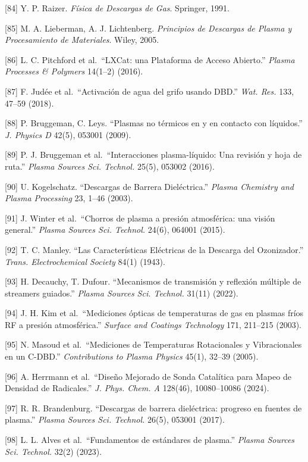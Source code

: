 \documentclass[
]{article}
\begin{document}
{[}84{]} Y. P. Raizer. \emph{Física de Descargas de Gas}. Springer,
1991.

{[}85{]} M. A. Lieberman, A. J. Lichtenberg. \emph{Principios de
Descargas de Plasma y Procesamiento de Materiales}. Wiley, 2005.

{[}86{]} L. C. Pitchford et al.~``LXCat: una Plataforma de Acceso
Abierto.'' \emph{Plasma Processes \& Polymers} 14(1--2) (2016).

{[}87{]} F. Judée et al.~``Activación de agua del grifo usando DBD.''
\emph{Wat. Res.} 133, 47--59 (2018).

{[}88{]} P. Bruggeman, C. Leys. ``Plasmas no térmicos en y en contacto
con líquidos.'' \emph{J. Physics D} 42(5), 053001 (2009).

{[}89{]} P. J. Bruggeman et al.~``Interacciones plasma-líquido: Una
revisión y hoja de ruta.'' \emph{Plasma Sources Sci. Technol.} 25(5),
053002 (2016).

{[}90{]} U. Kogelschatz. ``Descargas de Barrera Dieléctrica.''
\emph{Plasma Chemistry and Plasma Processing} 23, 1--46 (2003).

{[}91{]} J. Winter et al.~``Chorros de plasma a presión atmosférica: una
visión general.'' \emph{Plasma Sources Sci. Technol.} 24(6), 064001
(2015).

{[}92{]} T. C. Manley. ``Las Características Eléctricas de la Descarga
del Ozonizador.'' \emph{Trans. Electrochemical Society} 84(1) (1943).

{[}93{]} H. Decauchy, T. Dufour. ``Mecanismos de transmisión y reflexión
múltiple de streamers guiados.'' \emph{Plasma Sources Sci. Technol.}
31(11) (2022).

{[}94{]} J. H. Kim et al.~``Mediciones ópticas de temperaturas de gas en
plasmas fríos RF a presión atmosférica.'' \emph{Surface and Coatings
Technology} 171, 211--215 (2003).

{[}95{]} N. Masoud et al.~``Mediciones de Temperaturas Rotacionales y
Vibracionales en un C-DBD.'' \emph{Contributions to Plasma Physics}
45(1), 32--39 (2005).

{[}96{]} A. Herrmann et al.~``Diseño Mejorado de Sonda Catalítica para
Mapeo de Densidad de Radicales.'' \emph{J. Phys. Chem. A} 128(46),
10080--10086 (2024).

{[}97{]} R. R. Brandenburg. ``Descargas de barrera dieléctrica: progreso
en fuentes de plasma.'' \emph{Plasma Sources Sci. Technol.} 26(5),
053001 (2017).

{[}98{]} L. L. Alves et al.~``Fundamentos de estándares de plasma.''
\emph{Plasma Sources Sci. Technol.} 32(2) (2023).
\end{document}
